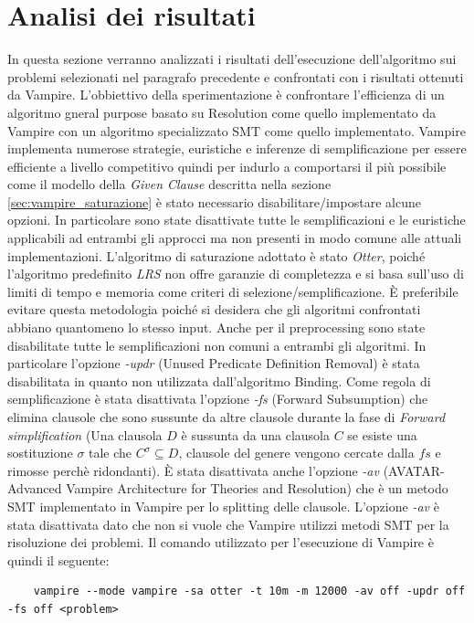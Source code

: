 \documentclass[./main.tex]{subfiles}
\begin{document}
\section{Analisi dei risultati}
In questa sezione verranno analizzati i risultati dell'esecuzione dell'algoritmo sui problemi selezionati nel paragrafo precedente
e confrontati con i risultati ottenuti da Vampire. 
L'obbiettivo della sperimentazione è confrontare l'efficienza di un algoritmo gneral purpose basato su Resolution come quello implementato da Vampire
con un algoritmo specializzato SMT come quello implementato.
Vampire implementa numerose strategie, euristiche e inferenze di semplificazione per essere efficiente a livello competitivo
quindi per indurlo a comportarsi il più possibile come il modello della \textit{Given Clause} descritta 
nella sezione \ref{sec:vampire_saturazione} è stato necessario disabilitare/impostare alcune opzioni.
In particolare sono state disattivate tutte le semplificazioni 
e le euristiche applicabili ad entrambi gli approcci ma non presenti in modo comune alle attuali implementazioni.
L'algoritmo di saturazione adottato è stato \textit{Otter}, 
poiché l'algoritmo predefinito \textit{LRS} non offre garanzie di completezza e
si basa sull'uso di limiti di tempo e memoria come criteri di selezione/semplificazione. 
È preferibile evitare questa metodologia poiché si desidera che gli algoritmi confrontati abbiano quantomeno lo stesso input.
Anche per il preprocessing sono state disabilitate tutte le semplificazioni non comuni a entrambi gli algoritmi.
In particolare l'opzione \textit{-updr} (Unused Predicate Definition Removal) è stata disabilitata in quanto non utilizzata dall'algoritmo
Binding. 
Come regola di semplificazione è stata disattivata l'opzione \textit{-fs} (Forward Subsumption) che elimina 
clausole che sono sussunte da altre clausole durante la fase di \textit{Forward simplification} 
(Una clausola $D$ è sussunta da una clausola $C$ se esiste una sostituzione $\sigma$ tale che 
$C^\sigma \subseteq D$, clausole del genere vengono cercate dalla $fs$ e rimosse perchè ridondanti).
È stata disattivata anche l'opzione \textit{-av} (AVATAR-Advanced Vampire Architecture
for Theories and Resolution) che è un metodo SMT implementato in Vampire per lo splitting delle clausole.
L'opzione \textit{-av} è stata disattivata dato che non si vuole che Vampire utilizzi metodi SMT per la risoluzione dei problemi.
Il comando utilizzato per l'esecuzione di Vampire è quindi il seguente:
\begin{verbatim}
    vampire --mode vampire -sa otter -t 10m -m 12000 -av off -updr off -fs off <problem>
\end{verbatim}
\end{document}
